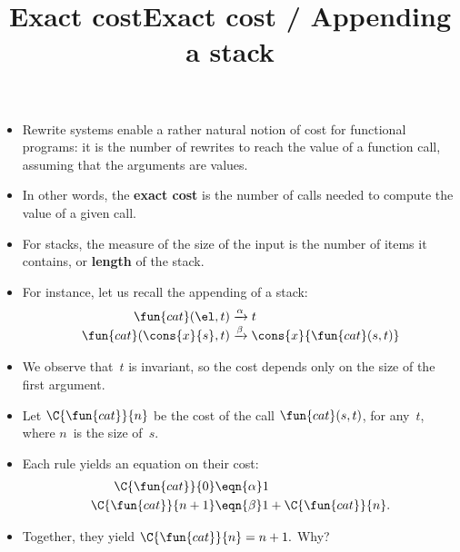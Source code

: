 \documentclass[wide]{slides}
\begin{document}
\begin{slide}
  \title{Exact cost}

  \begin{itemize}

    \item Rewrite systems enable a rather natural notion of cost for
      functional programs: it is the number of rewrites to reach the
      value of a function call, assuming that the arguments are
      values.

    \item In other words, the \textbf{exact cost} is the number of
      calls needed to compute the value of a given call.

    \item For stacks, the measure of the size of the input is the
      number of items it contains, or \textbf{length} of the stack.

  \end{itemize}

\end{slide}


\begin{slide}
  \title{Exact cost / Appending a stack}

  \begin{itemize}

    \item For instance, let us recall the appending of a stack:
      \begin{align*}
        \fun{cat}(        \el,t) &\xrightarrow{\alpha} t\\
        \fun{cat}(\cons{x}{s},t) &\xrightarrow{\smash{\beta}}
        \cons{x}{\fun{cat}(s,t)}
      \end{align*}

    \item We observe that~\(t\) is invariant, so the cost depends only
      on the size of the first argument.

    \item Let \(\C{\fun{cat}}{n}\) be the cost of the call
      \(\fun{cat}(s,t)\), for any~\(t\), where \(n\)~is the size
      of~\(s\).

    \item Each rule yields an equation on their cost:
      \begin{align*}
        \C{\fun{cat}}{0} & \eqn{\alpha} 1\\
        \C{\fun{cat}}{n+1} & \eqn{\smash{\beta}} 1
        + \C{\fun{cat}}{n}.
      \end{align*}

      \item Together, they yield \(\C{\fun{cat}}{n} = n + 1.\) Why?

  \end{itemize}

\end{slide}
\end{document}
